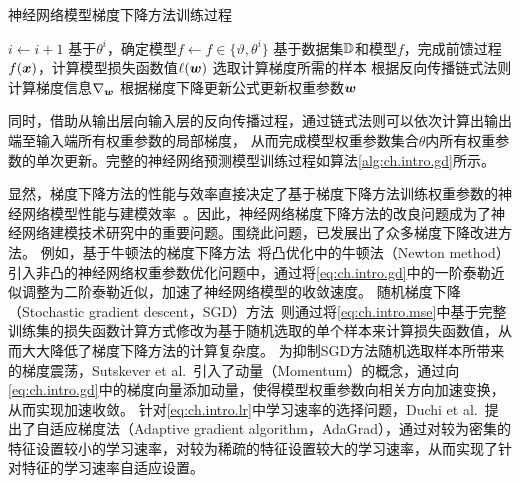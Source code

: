 \begin{algorithm}[t!]
    \caption{神经网络模型梯度下降方法训练过程}
    \renewcommand{\algorithmcfname}{算法}
    \renewcommand{\algorithmicrequire}{\textbf{输入:}}
    \renewcommand{\algorithmicensure}{\textbf{输出:}}
    \label{alg:ch.intro.gd}
    \begin{algorithmic}[1]
        \STATE \(i\leftarrow i+1\)
        \STATE 基于\(\theta^i\)，确定模型\(f \leftarrow  f \in \{\vartheta, \theta^i\}\)
        \STATE 基于数据集\(\mathbb{D}\)和模型\(f\)，完成前馈过程\(f(\bm{x})\)，计算模型损失函数值\(\ell({\bm{w}}) \)
        \STATE 选取计算梯度所需的样本
        \STATE 根据反向传播链式法则计算梯度信息\(\nabla_{\bm{w}}\)
        \STATE 根据梯度下降更新公式更新权重参数\(\bm{w}\)
        \ENDFOR
        \ENDWHILE
    \end{algorithmic}
    \medskip
\end{algorithm}

同时，借助从输出层向输入层的反向传播过程，通过链式法则可以依次计算出输出端至输入端所有权重参数的局部梯度，
从而完成模型权重参数集合\(\theta\)内所有权重参数的单次更新。完整的神经网络预测模型训练过程如算法\ref{alg:ch.intro.gd}所示。

显然，梯度下降方法的性能与效率直接决定了基于梯度下降方法训练权重参数的神经网络模型性能与建模效率~\cite{liuImproved2020}。因此，神经网络梯度下降方法的改良问题成为了神经网络建模技术研究中的重要问题。围绕此问题，已发展出了众多梯度下降改进方法。
例如，基于牛顿法的梯度下降方法~\cite{bennettNewton1916}将凸优化中的牛顿法（Newton method）引入非凸的神经网络权重参数优化问题中，通过将\autoref{eq:ch.intro.gd}中的一阶泰勒近似调整为二阶泰勒近似，加速了神经网络模型的收敛速度\cite{nesterovMethod1983a,nesterovCubic2006}。
随机梯度下降（Stochastic gradient descent，SGD）方法~\cite{bottouStochastic2012}则通过将\autoref{eq:ch.intro.mse}中基于完整训练集的损失函数计算方式修改为基于随机选取的单个样本来计算损失函数值，从而大大降低了梯度下降方法的计算复杂度。
为抑制SGD方法随机选取样本所带来的梯度震荡，Sutskever et al.~\cite{sutskeverImportance2013}引入了动量（Momentum）的概念，通过向\autoref{eq:ch.intro.gd}中的梯度向量添加动量，使得模型权重参数向相关方向加速变换，从而实现加速收敛。
针对\autoref{eq:ch.intro.lr}中学习速率的选择问题，Duchi et al.~\cite{duchiAdaptive2011}提出了自适应梯度法（Adaptive gradient algorithm，AdaGrad），通过对较为密集的特征设置较小的学习速率，对较为稀疏的特征设置较大的学习速率，从而实现了针对特征的学习速率自适应设置。

